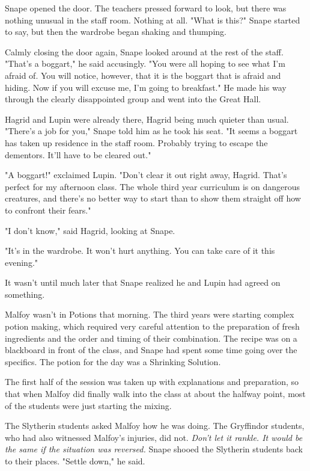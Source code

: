 Snape opened the door. The teachers pressed forward to look, but there was nothing unusual in the staff room. Nothing at all. "What is this?" Snape started to say, but then the wardrobe began shaking and thumping.

Calmly closing the door again, Snape looked around at the rest of the staff. "That's a boggart," he said accusingly. "You were all hoping to see what I'm afraid of. You will notice, however, that it is the boggart that is afraid and hiding. Now if you will excuse me, I'm going to breakfast." He made his way through the clearly disappointed group and went into the Great Hall.

Hagrid and Lupin were already there, Hagrid being much quieter than usual. "There's a job for you," Snape told him as he took his seat. "It seems a boggart has taken up residence in the staff room. Probably trying to escape the dementors. It'll have to be cleared out."

"A boggart!" exclaimed Lupin. "Don't clear it out right away, Hagrid. That's perfect for my afternoon class. The whole third year curriculum is on dangerous creatures, and there's no better way to start than to show them straight off how to confront their fears."

"I don't know," said Hagrid, looking at Snape.

"It's in the wardrobe. It won't hurt anything. You can take care of it this evening."

It wasn't until much later that Snape realized he and Lupin had agreed on something.

Malfoy wasn't in Potions that morning. The third years were starting complex potion making, which required very careful attention to the preparation of fresh ingredients and the order and timing of their combination. The recipe was on a blackboard in front of the class, and Snape had spent some time going over the specifics. The potion for the day was a Shrinking Solution.

The first half of the session was taken up with explanations and preparation, so that when Malfoy did finally walk into the class at about the halfway point, most of the students were just starting the mixing.

The Slytherin students asked Malfoy how he was doing. The Gryffindor students, who had also witnessed Malfoy's injuries, did not. \emph{Don't let it rankle. It would be the same if the situation was reversed.} Snape shooed the Slytherin students back to their places. "Settle down," he said.

